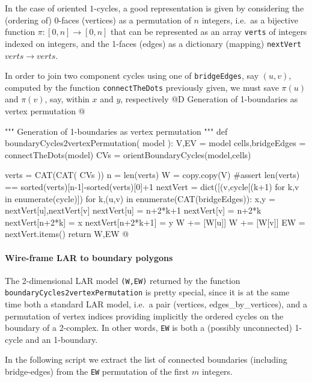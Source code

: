 \documentclass[11pt,oneside]{article}	%
\begin{document}
In the case of oriented $1$-cycles, a good representation is given by considering the (ordering of) 0-faces (vertices) as a permutation of $n$ integers, i.e.~as a bijective function $\pi :[0,n]\to[0,n]$ that can be represented as an array \texttt{verts} of integers indexed on integers, and the 1-faces (edges) as a dictionary (mapping) \texttt{nextVert} $verts\to verts$.

In order to join two component cycles using one of \texttt{bridgeEdges}, say $(u,v)$, computed by the function \texttt{connectTheDots} previously given, we must save $\pi(u)$ and $\pi(v)$, say, within $x$ and $y$, respectively
@D Generation of 1-boundaries as vertex permutation 
@{""" Generation of 1-boundaries as vertex permutation """
def boundaryCycles2vertexPermutation( model ):
    V,EV = model
    cells,bridgeEdges = connectTheDots(model)
    CVs = orientBoundaryCycles(model,cells)
    
    verts = CAT(CAT( CVs ))
    n = len(verts)
    W = copy.copy(V)
    #assert len(verts) == sorted(verts)[n-1]-sorted(verts)[0]+1
    nextVert = dict([(v,cycle[(k+1)%
                   for k,v in enumerate(cycle)])
    for k,(u,v) in enumerate(CAT(bridgeEdges)):
        x,y = nextVert[u],nextVert[v]
        nextVert[u] = n+2*k+1
        nextVert[v] = n+2*k      
        nextVert[n+2*k] = x
        nextVert[n+2*k+1] = y
        W += [W[u]]
        W += [W[v]]
        EW = nextVert.items()
    return W,EW
@}

\paragraph{Wire-frame LAR to boundary polygons}
The 2-dimensional LAR model \texttt{(W,EW)} returned by the function \texttt{boundaryCycles2vertexPermutation} is pretty special, since it is at the same time both a standard LAR model, i.e.~a pair (vertices, edges\_by\_vertices), and a permutation of vertex indices providing implicitly the ordered cycles on the boundary of a 2-complex. In other words, \texttt{EW} is both a (possibly unconnected) 1-cycle and an 1-boundary.

In the following script we extract the list of connected boundaries (including bridge-edges) from the \texttt{EW} permutation of the first $m$ integers.
\end{document}
